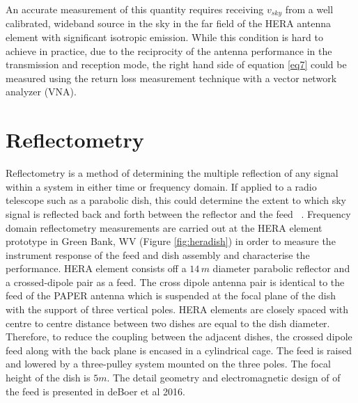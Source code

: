 \documentclass[twocolumn]{emulateapj}
\newcommand{\volt}{{v}}
\newcommand{\dfngexp}{{e^{2\pi i\nu \Delta \tau}}}
\begin{document}
    
    An accurate measurement of this quantity requires receiving $v_{sky}$ from a
    well calibrated, wideband source in the sky in the far field of the HERA
    antenna element with significant isotropic emission. While this condition is
    hard to achieve in practice, due to the reciprocity of the antenna performance
    in the transmission and reception mode, the right hand side of equation
    \ref{eq7} could be measured using the return loss measurement technique with a
    vector network analyzer (VNA). \\
    
    \section{\textbf{Reflectometry}} 
    
    Reflectometry is a method of determining the multiple reflection of any signal within 
    a system in either time or frequency domain. If applied to a radio telescope such as
     a parabolic dish, this could determine the extent to which 
    sky signal is reflected back and forth between the reflector and the feed ~\citep{2015arXiv150205862P}.
    Frequency domain reflectometry measurements are carried out at the HERA element prototype in
    Green Bank, WV (Figure \ref{fig:heradish}) in order to measure the instrument
    response of the feed and dish assembly and characterise the performance.  HERA
    element consists off a $14\,m$ diameter parabolic reflector and a
    crossed-dipole pair as a feed. The cross dipole antenna pair is identical to
    the feed of the PAPER antenna which is suspended at the focal plane of the dish
    with the support of three vertical poles. HERA elements are closely spaced with
    centre to centre distance between two dishes are equal to the dish diameter.
    Therefore, to reduce the coupling between the adjacent dishes, the crossed
    dipole feed along with the back plane is encased in a cylindrical cage. The
    feed is raised and lowered by a three-pulley system mounted on the three poles.
    The focal height of the dish is $5m$.  The detail geometry and electromagnetic
    design of of the feed is presented in deBoer et al 2016. \\
    
\end{document}
